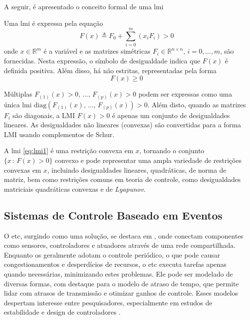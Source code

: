 A seguir, é apresentado o conceito formal de uma \acrshort{lmi}

\begin{definition}
  Uma \acrshort{lmi} é expressa pela equação \begin{equation} F(x) \triangleq F_0 + \sum_{i=0}^{m}(x_iF_i) > 0 \label{eq:lmi1}\end{equation} onde $x \in \mathbb{R}^m$ é a variável e as matrizes simétricas $F_i \in \mathbb{R}^{n \times n}, \, i = 0, . . . , m$, são fornecidas. Nesta expressão, o símbolo de desigualdade indica que $F(x)$ é definida positiva. Além disso, há  não estritas, representadas pela forma \begin{equation} F(x) \geq 0 \end{equation}
\end{definition}

Múltiplas   $F_{(1)}(x) > 0, \, ..., \, F_{(p)}(x) > 0$ podem ser expressas como uma única \acrshort{lmi} $\mathrm{diag}(F_{(1)}(x), \, ..., \, F_{(p)}(x)) > 0$. Além disto, quando as matrizes $F_i$ são diagonais, a LMI $F(x) > 0$ é apenas um conjunto de desigualdades lineares. As desigualdades não lineares (convexas) são convertidas para a forma LMI usando complementos de Schur.

A \acrshort{lmi} \eqref{eq:lmi1} é uma restrição convexa em $x$, tornando o conjunto $\{x \, : \, F(x) > 0\}$ convexo e pode representar uma ampla variedade de restrições convexas em $x$, incluindo desigualdades lineares, quadráticas, de norma de matriz, bem como restrições comuns em teoria de controle, como desigualdades matriciais quadráticas convexas e de \textit{Lyapunov}.

\subsection{Sistemas de Controle Baseado em Eventos} \label{subsection:etc}

O \acrfull{etc}, surgindo como uma solução, se destaca em , onde conectam componentes como sensores, controladores e atuadores através de uma rede compartilhada. Enquanto os  geralmente adotam o controle periódico, o que pode causar congestionamentos e desperdícios de recursos, o \acrshort{etc} executa tarefas apenas quando necessárias, minimizando estes problemas. Ele pode ser modelado de diversas formas, com destaque para o modelo de atraso de tempo, que permite lidar com atrasos de transmissão e otimizar ganhos de controle. Esses modelos despertam interesse entre pesquisadores, especialmente em estudos de estabilidade e design de controladores \citep{peng2018}.


